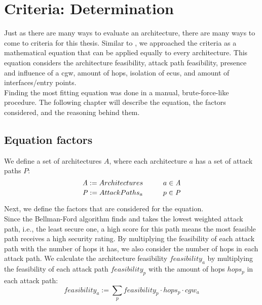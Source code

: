 \chapter{Criteria: Determination}
\label{chp:criteria}

Just as there are many ways to evaluate an architecture, there are many ways to come to criteria for this thesis.
Similar to \cite{threat_surf}, we approached the criteria as a mathematical equation that can be applied equally to every architecture.
This equation considers the architecture feasibility, attack path feasibility, presence and influence of a \acrshort{cgw},
amount of hops, isolation of \acrshort{ecu}s, and amount of interfaces/entry points.\\

Finding the most fitting equation was done in a manual, brute-force-like procedure.
The following chapter will describe the equation, the factors considered, and the reasoning behind them.\\

\section{Equation factors}
\label{sec:equation_factors}

We define a set of architectures $\mathit{A}$, where each architecture $a$ has a set of attack paths $\mathit{P}$:\\
\begin{equation}
    \mathit{A} := {Architectures} \hspace*{1cm} a \in \mathit{A} \label{eq:architectures}
\end{equation}
\begin{equation}
    \mathit{P} := {Attack Paths_{a}} \hspace*{1cm} p \in \mathit{P} \label{eq:attack_paths}
\end{equation}

\hfill \break

Next, we define the factors that are considered for the equation.\\

Since the Bellman-Ford algorithm finds and takes the lowest weighted attack path, i.e., the least secure one, 
a high score for this path means the most feasible path receives a high security rating.
By multiplying the feasibility of each attack path with the number of hops it has, we also consider the number of hops in each attack path.
We calculate the architecture feasibility $feasibility_{a}$ by multiplying the feasibility of each attack path $feasibility_{p}$ with the amount of hops $hops_{p}$ in each attack path:
\begin{equation}
    feasibility_{a} := \sum_{p} feasibility_{p} \cdot  hops_{p} \cdot  cgw_{a} \label{eq:feasibility}
\end{equation}

